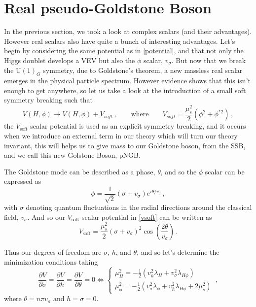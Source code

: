 \section{Real pseudo-Goldstone Boson}

In the previous section, we took a look at complex scalars (and their advantages). However real scalars also have quite a bunch of interesting advantages. 
Let's begin by considering the same potential as in \autoref{potential}, and that not only the Higgs doublet develops a VEV but also the $\phi$ scalar, $v_\sigma$. But now that we break the U$(1)_G$ symmetry, due to Goldstone's theorem, a new massless real scalar emerges in the physical particle spectrum.
However evidence shows that this isn't enough to get anywhere, so let us take a look at the introduction of a small soft symmetry breaking such that \cite{Freitas_2021}
\begin{equation}
	\label{vsoft}
	V(H,\phi)\rightarrow V(H,\phi)+V_{soft}\,, \quad \quad \textrm{where} \quad \quad V_{soft}=\frac{\mu_s^2}{2}(\phi^2+\phi^{*2})\,,
\end{equation}    
the $V_{\textrm{soft}}$ scalar potential is used as an explicit symmetry breaking, and it occurs when we introduce an external term in our theory which will turn our theory invariant, this will helps us to give mass to our Goldstone boson, from the SSB, and we call this new Golstone Boson, pNGB.

The Goldstone mode can be described as a phase, $\theta$, and so the $\phi$ scalar can be expressed as
\begin{equation}
	\phi=\frac{1}{\sqrt{2}}(\sigma+v_\sigma)e^{i\theta/v_\sigma}\,,
\end{equation}
with $\sigma$ denoting quantum fluctuations in the radial directions around the classical field, $v_\sigma$. And so our $V_\textrm{soft}$ scalar potential in \autoref{vsoft} can be written as 
\begin{equation}
	\label{newvsoft}
	V_\textrm{soft}=\dfrac{\mu_s^2}{2}(\sigma+v_\sigma)^2\cos\left(\dfrac{2\theta}{v_\sigma}\right)\,.
\end{equation}


Thus our degrees of freedom are $\sigma$, $h$, and $\theta$, and so let's determine the minimization conditions taking
\begin{equation}
	\frac{\partial V}{\partial \sigma}=\frac{\partial V}{\partial h}=\frac{\partial V}{\partial \theta}=0 \Leftrightarrow \left\{\begin{array}{c}
		\mu_H^2=-\frac{1}{2}(v_h^2\lambda_H+v_\sigma^2\lambda_{H\phi}) \\
		\mu_\phi^2=-\frac{1}{2}(v_\sigma^2\lambda_\phi+v_h^2\lambda_{H\phi}+2\mu_s^2)
	\end{array} \right. \,,
\end{equation}
where $\theta=n\pi v_\sigma \textrm{ and } h=\sigma=0$.

